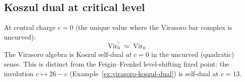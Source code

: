 \subsection{Koszul dual at critical level}

\begin{theorem}[Virasoro uncurved self-duality at \texorpdfstring{$c=0$}{c=0}; \ClaimStatusProvedHere]
\label{thm:virasoro-self-duality}
At central charge $c = 0$ (the unique value where the Virasoro bar complex
is uncurved):
\begin{equation}
\mathrm{Vir}_0^! \;\simeq\; \mathrm{Vir}_0
\end{equation}
The Virasoro algebra is Koszul self-dual \emph{at} $c=0$ in the uncurved
(quadratic) sense.  This is distinct from the Feigin--Frenkel
level-shifting fixed point: the involution $c \mapsto 26-c$
(Example~\textup{\ref{ex:virasoro-koszul-dual}}) is self-dual at $c = 13$.
\end{theorem}

